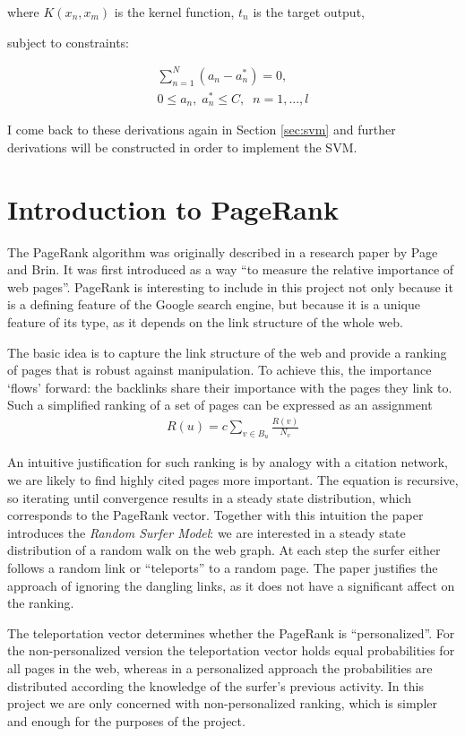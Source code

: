 \documentclass[12pt,notitlepage,twoside]{scrreprt}
\begin{document}
where \(K(x_n,x_m) \) is the kernel function, \(t_n\) is the target output,

subject to constraints:

\begin{gather}
  \sum_{n=1}^{N}(a_n-a_n^*)=0,\\
  0\leq a_n,\; a_n^*\leq C,\;\;    n=1,...,l 
\end{gather}

I come back to these derivations again in Section \ref{sec:svm} and further derivations
will be constructed in order to implement the SVM.
\section{Introduction to PageRank}
\label{prep:pr}
The PageRank algorithm was originally described in a research paper
by Page and Brin\cite{pagerank}. It was first introduced as a way ``to measure
the relative importance of web pages''. PageRank is interesting to include in
this project not only because it is a defining feature of the Google search
engine, but because it is a unique feature of its type, as it depends on the link
structure of the whole web.

The basic idea is to capture the link structure of the web and provide a
ranking of pages that is robust against manipulation. To achieve this, the
importance `flows' forward: the backlinks share their importance with the pages
they link to. Such a simplified ranking of a set of pages can be expressed as an assignment
\begin{gather}
  R(u)=c\sum_{v\in B_u}\frac{R(v)}{N_v}
\end{gather}

An intuitive justification for such ranking is by analogy with a citation
network, we are likely to find highly cited pages more important.
The equation is recursive, so iterating until convergence results in a steady
state distribution, which corresponds to the PageRank vector.
Together with this intuition the paper introduces the \textit{Random Surfer
Model}: we are interested in a steady state distribution of a random walk on
the web graph. At each step the surfer either follows a random link or
``teleports'' to a random page. The paper justifies the approach of ignoring the
dangling links, as it does not have a significant affect on the ranking. 

The teleportation vector determines whether the PageRank is ``personalized''. For
the non-personalized version the teleportation vector holds equal probabilities
for all pages in the web, whereas in a personalized approach the probabilities
are distributed according the knowledge of the surfer's previous activity. In
this project we are only concerned with non-personalized ranking, which is simpler and
enough for the purposes of the project.
\end{document}
